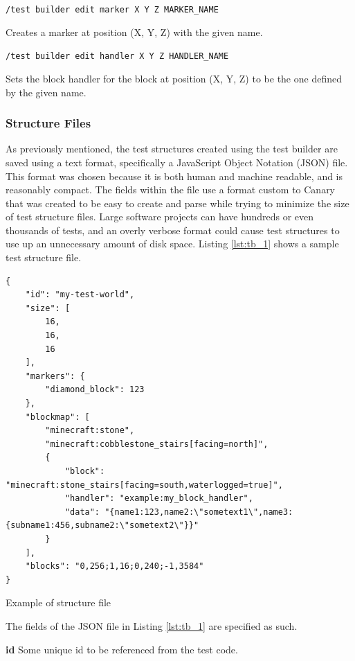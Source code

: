 \documentclass[12pt]{article}
\def\code#1{\texttt{#1}}
\newenvironment{longcode}{\captionsetup{type=listing}}{}
\begin{document}
\begin{onehalfspacing}
\noindent\code{/test builder edit marker X Y Z MARKER\_NAME}

Creates a marker at position (X, Y, Z) with the given name.

\noindent\code{/test builder edit handler X Y Z HANDLER\_NAME}

Sets the block handler for the block at position (X, Y, Z) to be the one
defined by the given name.

\subsubsection{Structure Files}

As previously mentioned, the test structures created using the test
builder are saved using a text format, specifically a JavaScript Object
Notation (JSON) file. This format was chosen because it is both human
and machine readable, and is reasonably compact. The fields within the
file use a format custom to Canary that was created to be easy to create
and parse while trying to minimize the size of test structure files.
Large software projects can have hundreds or even thousands of tests,
and an overly verbose format could cause test structures to use up an
unnecessary amount of disk space. Listing \ref{lst:tb_1} shows a sample test
structure file.


\begin{longcode}

\begin{verbatim}
{
    "id": "my-test-world",
    "size": [
        16,
        16,
        16
    ],
    "markers": {
        "diamond_block": 123
    },
    "blockmap": [
        "minecraft:stone",
        "minecraft:cobblestone_stairs[facing=north]",
        {
            "block": "minecraft:stone_stairs[facing=south,waterlogged=true]",
            "handler": "example:my_block_handler",
            "data": "{name1:123,name2:\"sometext1\",name3:{subname1:456,subname2:\"sometext2\"}}"
        }
    ],
    "blocks": "0,256;1,16;0,240;-1,3584"
}
\end{verbatim}
  \caption{Example of structure file}
  \label{lst:tb_1}
\end{longcode}

The fields of the JSON file in Listing \ref{lst:tb_1} are specified as such.

\noindent\textbf{id}
Some unique id to be referenced from the test code.


\end{onehalfspacing}
\end{document}
